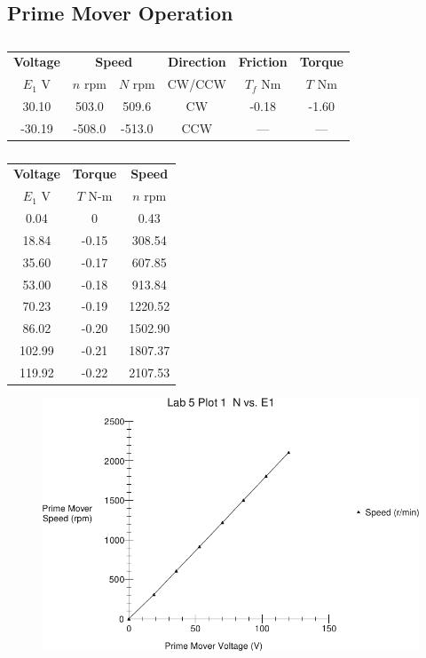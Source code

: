 \documentclass{article}
\begin{document}
\subsection{Prime Mover Operation}

\begin{table}[H]
  \centering
  \begin{tabular}{*{6}{c}}
    \textbf{Voltage} & \multicolumn{2}{c}{\textbf{Speed}} & \textbf{Direction}
    & \textbf{Friction} & \textbf{Torque} \\
    $E_1$ V & $n$ rpm & $N$ rpm & CW/CCW & $T_f$ Nm & $T$ Nm \\
    \hline
     30.10 &  503.0 &  509.6 &  CW & -0.18 & -1.60 \\
    -30.19 & -508.0 & -513.0 & CCW &   --- &   --- \\
  \end{tabular}
  \caption{}
  \label{tab:table_01}
\end{table}

\begin{table}[H]
  \centering
  \begin{tabular}{*{3}{c}}
    \textbf{Voltage} & \textbf{Torque} & \textbf{Speed} \\
    $E_1$ V          & $T$ N-m         & $n$ rpm \\

    \hline

      0.04 &     0 &    0.43 \\
     18.84 & -0.15 &  308.54 \\
     35.60 & -0.17 &  607.85 \\
     53.00 & -0.18 &  913.84 \\
     70.23 & -0.19 & 1220.52 \\
     86.02 & -0.20 & 1502.90 \\
    102.99 & -0.21 & 1807.37 \\
    119.92 & -0.22 & 2107.53 \\
  \end{tabular}
  \caption{}
  \label{tab:table_02}
\end{table}

\begin{figure}[H]
  \centering
  \includegraphics[width=\textwidth]{img/plot1}
  \caption{}
  \label{fig:plot_01}
\end{figure}
\end{document}
